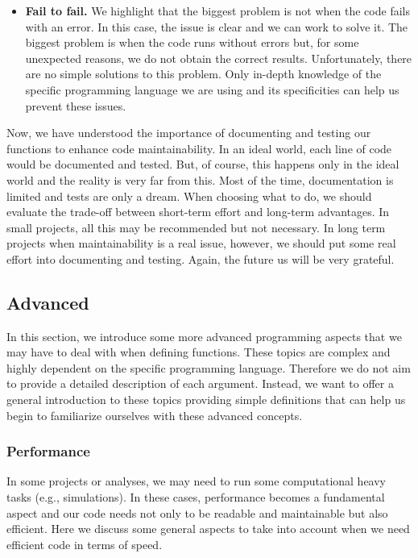 \documentclass[
  11pt,
]{book}
\begin{document}
\begin{itemize}
\item
  \textbf{Fail to fail.} We highlight that the biggest problem is not when the code fails with an error. In this case, the issue is clear and we can work to solve it. The biggest problem is when the code runs without errors but, for some unexpected reasons, we do not obtain the correct results. Unfortunately, there are no simple solutions to this problem. Only in-depth knowledge of the specific programming language we are using and its specificities can help us prevent these issues.
\end{itemize}

Now, we have understood the importance of documenting and testing our functions to enhance code maintainability. In an ideal world, each line of code would be documented and tested. But, of course, this happens only in the ideal world and the reality is very far from this. Most of the time, documentation is limited and tests are only a dream. When choosing what to do, we should evaluate the trade-off between short-term effort and long-term advantages. In small projects, all this may be recommended but not necessary. In long term projects when maintainability is a real issue, however, we should put some real effort into documenting and testing. Again, the future us will be very grateful.

\hypertarget{advanced}{%
\subsection{Advanced}\label{advanced}}

In this section, we introduce some more advanced programming aspects that we may have to deal with when defining functions. These topics are complex and highly dependent on the specific programming language. Therefore we do not aim to provide a detailed description of each argument. Instead, we want to offer a general introduction to these topics providing simple definitions that can help us begin to familiarize ourselves with these advanced concepts.

\hypertarget{performance}{%
\subsubsection{Performance}\label{performance}}

In some projects or analyses, we may need to run some computational heavy tasks (e.g., simulations). In these cases, performance becomes a fundamental aspect and our code needs not only to be readable and maintainable but also efficient. Here we discuss some general aspects to take into account when we need efficient code in terms of speed.
\end{document}
